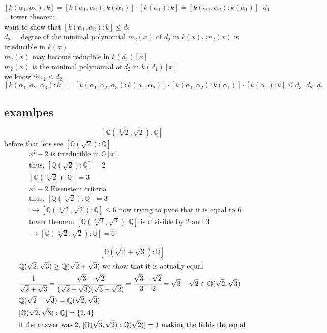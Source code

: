 \documentclass{article}
\begin{document}
$[k(\alpha_1,\alpha_2):k]= [k(\alpha_1,\alpha_2):k(\alpha_1)] \cdot [k(\alpha_1):k] = [k(\alpha_1,\alpha_2):k(\alpha_1)] \cdot d_1$ .. tower theorem \\ 
want to show that $[k(\alpha_1,\alpha_2):k] \leq d_2$ \\
$d_2$ = degree of the minimal polynomial $m_2(x)$ of $d_2$ in $k(x)$. $m_2(x)$ is irreducible in $k(x)$ \\

$m_2(x)$ may become reducible in $k(d_1)[x]$ \\
$\bar{m_2}(x)$ is the minimal polynomial of $d_2$ in $k(d_1)[x]$ \\
we know $\partial \bar{m}_2 \leq d_2$ \\

$[k(\alpha_1, \alpha_2, \alpha_3): k ] = [k(\alpha_1, \alpha_2, \alpha_3): k(\alpha_1, \alpha_2)] \cdot [k(\alpha_1, \alpha_2): k(\alpha_1)] \cdot [k(\alpha_1): k] \leq d_3 \cdot d_2 \cdot d_1$ \\

\subsection{examlpes}
$$[\mathbb{Q}(\sqrt[3]{2}, \sqrt{2}): \mathbb{Q}]$$
before that lets see $[\mathbb{Q}(\sqrt{2}) : \mathbb{Q}]$
\begin{align*}
    &x^2 - 2 \text{ is irreducible in } \mathbb{Q}[x] \\ 
    &\text{thus, }     [\mathbb{Q}(\sqrt{2}) : \mathbb{Q}] = 2\\ 
    &[\mathbb{Q}(\sqrt[3]{2}) : \mathbb{Q}]  = 3 \\ 
    &x^3 - 2 \text{ Eisenstein criteria } \\ 
    &\text{thus, } [\mathbb{Q}(\sqrt[3]{2}) : \mathbb{Q}] = 3\\ 
    &\rightarrowtail[\mathbb{Q}(\sqrt[3]{2}, \sqrt{2}): \mathbb{Q}] \leq 6 \text{ now trying to pvoe that it is equal to 6}\\ 
    &\text{tower theorem }[\mathbb{Q}(\sqrt[3]{2}, \sqrt{2}): \mathbb{Q}] \text{ is divisible by 2 and 3}  \\ 
    &\rightarrow [\mathbb{Q}(\sqrt[3]{2}, \sqrt{2}): \mathbb{Q}] = 6
\end{align*} 

$$[\mathbb{Q}(\sqrt{2} + \sqrt{3}) : \mathbb{Q}]$$
\begin{align*}
    &\mathbb{Q}(\sqrt{2}, \sqrt{3}) \geq \mathbb{Q}(\sqrt{2} + \sqrt{3}) \text { we show that it is actually equal } \\
    &\cfrac{1}{\sqrt{2} + \sqrt{3}}   = \cfrac{\sqrt{3} - \sqrt{2}}{(\sqrt{2} + \sqrt{3})(\sqrt{3} - \sqrt{2})} = \cfrac{\sqrt{3} - \sqrt{2}}{3 - 2} = \sqrt{3} - \sqrt{2} \in \mathbb{Q}(\sqrt{2}, \sqrt{3}) \\
    &\mathbb{Q}(\sqrt{2} + \sqrt{3}) = \mathbb{Q}(\sqrt{2}, \sqrt{3})   \\
    &[\mathbb{Q}(\sqrt{2}, \sqrt{3}) : \mathbb{Q}] = \{2, 4\} \\ 
    &\text{if the answer was 2, } [\mathbb{Q}(\sqrt{3}, \sqrt{2}): \mathbb{Q}(\sqrt{2})] = 1 \text{ making the fields the equal} 
\end{align*}
\end{document}

